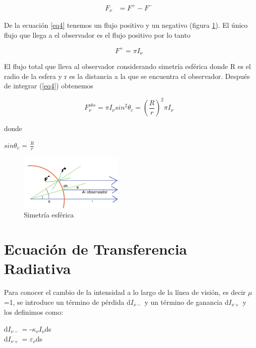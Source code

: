 \documentclass[a4paper]{article}
\begin{document}
\begin{equation} \label{eq4}
\begin{split}
   F_\nu  & = F^{+} - F^{-}
\end{split}
\end{equation}

De la ecuación \ref{eq4} tenemos un flujo positivo y un negativo (figura \ref{fig:1.3}). El único flujo que llega a el observador es el flujo positivo por lo tanto

$$F^{+} = \pi I_\nu$$

El flujo total que lleva al observador considerando simetría esférica donde R es el radio de la esfera y r es la distancia a la que se encuentra el observador. Después de integrar (\ref{eq4}) obtenemos

\begin{equation} \label{eq5}
   F^{obs}_{\nu} = \pi I_{\nu} sin^{2}\theta_{c} = \left(\frac{ R}{r}\right)^2 \pi I_{\nu} 
\end{equation}

donde

\begin{center}
   $sin\theta_{c}$  = $\frac{R}{r}$
\end{center}

\begin{figure}[h]
\centering
\includegraphics[width=5cm]{fig2.png}
\caption{Simetría esférica}
\label{fig:1.3}
\end{figure}

\newpage   
\section{Ecuación de Transferencia Radiativa}\label{ecu-tra-ra}

Para conocer el cambio de la intensidad a lo largo de la línea de visión, es decir $\mu$=1, se introduce un término de pérdida d$I_{\nu -}$ y un término de ganancia d$I_{\nu +}$ y los definimos como:

\begin{center}
d$I_{\nu -}$ = -$\kappa_{\nu} I_{\nu}$ds\\
d$I_{\nu +}$ = $\varepsilon_{\nu}$ds
\end{center}
\end{document}
